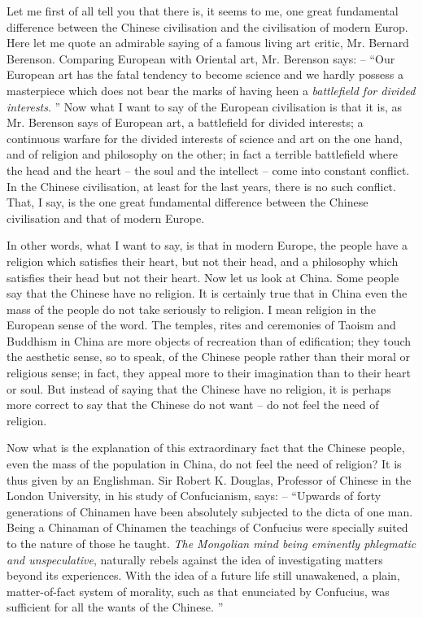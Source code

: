 Let me first of all tell you that there is, it seems to me,
one great fundamental difference between the Chinese civilisation and the civilisation of modern Europ.
Here let me quote an admirable saying of a famous living art critic, Mr. Bernard Berenson.
Comparing European with Oriental art, Mr. Berenson says:
-- ``Our European art has the fatal tendency to become science and
we hardly possess a masterpiece which does not bear the marks of
having heen a \emph{battlefield for divided interests}. ''
Now what I want to say of the European civilisation is that it is,
as Mr. Berenson says of European art, a battlefield for divided interests;
a continuous warfare for the divided interests of science and art on the one hand,
and of religion and philosophy on the other;
in fact a terrible battlefield where the head and the heart
-- the soul and the intellect -- come into constant conflict.
In the Chinese civilisation, at least for the last years,
there is no such conflict.
That, I say, is the one great fundamental difference between the Chinese civilisation and that of modern Europe.

In other words, what I want to say, is that in modern Europe, the people have a religion which satisfies their heart, but not their head, and a philosophy which satisfies their head but not their heart. Now let us look at China. Some people say that the Chinese have no religion. It is certainly true that in China even the mass of the people do not take seriously to religion. I mean religion in the European sense of the word. The temples, rites and ceremonies of Taoism and Buddhism in China are more objects of recreation than of edification; they touch the aesthetic sense, so to speak, of the Chinese people rather than their moral or religious sense; in fact, they appeal more to their imagination than to their heart or soul. But instead of saying that the Chinese have no religion, it is perhaps more correct to say that the Chinese do not want -- do not feel the need of religion.

Now what is the explanation of this extraordinary fact that the Chinese people, even the mass of the population in China, do not feel the need of religion? It is thus given by an Englishman. Sir Robert K. Douglas, Professor of Chinese in the London University, in his study of Confucianism, says: -- ``Upwards of forty generations of Chinamen have been absolutely subjected to the dicta of one man. Being a Chinaman of Chinamen the teachings of Confucius were specially suited to the nature of those he taught. \emph{The Mongolian mind being eminently phlegmatic and unspeculative}, naturally rebels against the idea of investigating matters beyond its experiences. With the idea of a future life still unawakened, a plain, matter-of-fact system of morality, such as that enunciated by Confucius, was sufficient for all the wants of the Chinese. ''

